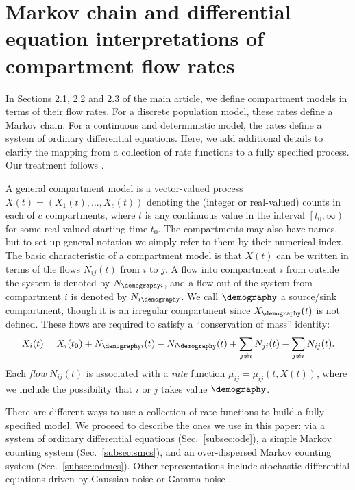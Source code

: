 \section{Markov chain and differential equation interpretations of compartment flow rates}

In Sections 2.1, 2.2 and 2.3 of the main article, we define compartment models in terms of their flow rates.
For a discrete population model, these rates define a Markov chain.
For a continuous and deterministic model, the rates define a system of ordinary differential equations.
Here, we add additional details to clarify the mapping from a collection of rate functions to a fully specified process.
Our treatment follows \citet{breto09}.

A general compartment model is a vector-valued process $X(t)=(X_1(t),\dots,X_c(t))$ denoting the (integer or real-valued) counts in each of $c$ compartments, where $t$ is any continuous value in the interval  $\left[t_0, \infty\right)$ for some real valued starting time $t_0$.
The compartments may also have names, but to set up general notation we simply refer to them by their numerical index.
The basic characteristic of a compartment model is that $X(t)$ can be written in terms of the flows $N_{ij}(t)$ from $i$ to $j$.
A flow into compartment $i$ from outside the system is denoted by $N_{\demography i}$, and a flow out of the system from compartment $i$ is denoted by $N_{i\demography}$.
We call $\demography$ a source/sink compartment, though it is an irregular compartment since $X_{\demography}(t)$ is not defined.
These flows are required to satisfy a ``conservation of mass'' identity:
\begin{equation}
X_i(t)=X_i(t_0)+N_{\demography i}(t) - N_{i\demography}(t) + \sum_{j\neq
i}N_{ji}(t)-\sum_{j\neq i}N_{ij}(t). \label{eq:conservation}
\end{equation}
Each {\em flow} $N_{ij}(t)$ is associated with a {\em rate} function
$\mu_{ij}=\mu_{ij}(t,X(t))$, where we include the possibility that $i$ or $j$ takes value $\demography$.

There are different ways to use a collection of rate functions to build a fully specified model.
We proceed to describe the ones we use in this paper: via a system of ordinary differential equations (Sec.~\ref{subsec:ode}), a simple Markov counting system (Sec.~\ref{subsec:smcs}), and an over-dispersed Markov counting system (Sec.~\ref{subsec:odmcs}). Other representations include stochastic differential equations driven by Gaussian noise or Gamma noise \citep{bhadra11}.

